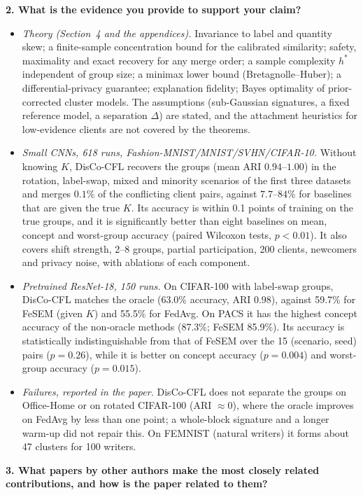 \documentclass[10pt]{article}
\begin{document}
\textbf{2. What is the evidence you provide to support your claim?}
\begin{itemize}
\item \emph{Theory (Section~4 and the appendices).} Invariance to label and quantity skew; a finite-sample concentration bound for the calibrated similarity; safety, maximality and exact recovery for any merge order; a sample complexity $h^\ast$ independent of group size; a minimax lower bound (Bretagnolle--Huber); a differential-privacy guarantee; explanation fidelity; Bayes optimality of prior-corrected cluster models. The assumptions (sub-Gaussian signatures, a fixed reference model, a separation $\Delta$) are stated, and the attachment heuristics for low-evidence clients are not covered by the theorems.
\item \emph{Small CNNs, 618 runs, Fashion-MNIST/MNIST/SVHN/CIFAR-10.} Without knowing $K$, DisCo-CFL recovers the groups (mean ARI $0.94$--$1.00$) in the rotation, label-swap, mixed and minority scenarios of the first three datasets and merges $0.1\%$ of the conflicting client pairs, against $7.7$--$84\%$ for baselines that are given the true $K$. Its accuracy is within 0.1 points of training on the true groups, and it is significantly better than eight baselines on mean, concept and worst-group accuracy (paired Wilcoxon tests, $p<0.01$). It also covers shift strength, 2--8 groups, partial participation, 200 clients, newcomers and privacy noise, with ablations of each component.
\item \emph{Pretrained ResNet-18, 150 runs.} On CIFAR-100 with label-swap groups, DisCo-CFL matches the oracle (63.0\% accuracy, ARI $0.98$), against 59.7\% for FeSEM (given $K$) and 55.5\% for FedAvg. On PACS it has the highest concept accuracy of the non-oracle methods (87.3\%; FeSEM 85.9\%). Its accuracy is statistically indistinguishable from that of FeSEM over the 15 (scenario, seed) pairs ($p=0.26$), while it is better on concept accuracy ($p=0.004$) and worst-group accuracy ($p=0.015$).
\item \emph{Failures, reported in the paper.} DisCo-CFL does not separate the groups on Office-Home or on rotated CIFAR-100 (ARI $\approx 0$), where the oracle improves on FedAvg by less than one point; a whole-block signature and a longer warm-up did not repair this. On FEMNIST (natural writers) it forms about 47 clusters for 100 writers.
\end{itemize}

\textbf{3. What papers by other authors make the most closely related contributions, and how is the paper related to them?}
\end{document}
